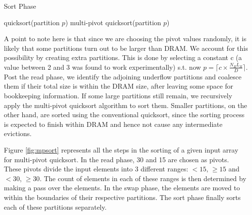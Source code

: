 \begin{algorithm}
\caption{Sort Phase}
\label{alg:sort_phase}
\begin{algorithmic}[1]
\State quicksort(partition $p$)
\Else 
\State multi-pivot quicksort(partition $p$)
\EndIf 
\EndFor
\end{algorithmic}
\end{algorithm}

A point to note here is that since we are choosing the pivot values randomly, it is likely that some partitions turn out to be larger than DRAM. We account for this possibility by creating extra partitions. This is done by selecting a constant c (a value between 2 and 3 was found to work experimentally) s.t. now $p = \lceil c \times \frac{N_R L_R}{D} \rceil$. Post the read phase, we identify the adjoining underflow partitions and coalesce them if their total size is within the DRAM size, after leaving some space for bookkeeping information. If some large partitions still remain, we recursively apply the multi-pivot quicksort algorithm to sort them. Smaller partitions, on the other hand, are sorted using the conventional quicksort, since the sorting process is expected to finish within DRAM and hence not cause any intermediate evictions. 

Figure \ref{fig:mpsort} represents all the steps in the sorting of a given input array for multi-pivot quicksort. In the read phase, 30 and 15 are chosen as pivots. These pivots divide the input elements into 3 different ranges: $< 15$, $\geq 15$ and $< 30$, $\geq 30$. The count of elements in each of these ranges is then determined by making a pass over the elements. In the swap phase, the elements are moved to within the boundaries of their respective partitions. The sort phase finally sorts each of these partitions separately.


